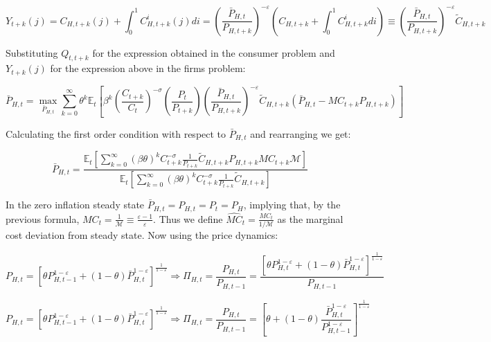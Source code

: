 \documentclass{article}
\newcommand{\Et}{\mathbb{E}_t}
\begin{document}
\begin{equation}
    Y_{t+k}(j) = C_{H,t+k}(j) + \int_0^1 C^i_{H, t+k}(j) di = \left( \frac{\bar P_{H,t}}{P_{H,t+k}} \right)^{-\varepsilon} \left(C_{H,t+k} +  \int_0^1 C^i_{H, t+k} di \right) \equiv \left( \frac{\bar P_{H,t}}{P_{H,t+k}} \right)^{-\varepsilon} \tilde C_{H,t+k}
\end{equation}

Substituting $Q_{t, t+k}$ for the expression obtained in the consumer problem and $Y_{t+k}(j)$ for the expression above in the firms problem:

\begin{equation}
    \bar P_{H,t} = \max_{\bar P_{H,t}} \sum^\infty_{k=0} \theta^k \Et \left[ \beta^k \left( \frac{C_{t+k}}{C_t} \right)^{-\sigma} \left( \frac{P_{t}}{P_{t+k}} \right) \left( \frac{\bar P_{H,t}}{P_{H,t+k}} \right)^{-\varepsilon} \tilde C_{H,t+k} (\bar P_{H,t} - MC_{t+k} P_{H,t+k})  \right]
\end{equation}

Calculating the first order condition with respect to $\bar P_{H,t}$ and rearranging we get:

\begin{equation}
    \bar P_{H,t} =  \frac{\Et\left[ \sum^\infty_{k=0} (\beta\theta)^k C_{t+k}^{-\sigma} \frac{1}{P_{t+k}}\tilde C_{H,t+k} P_{H,t+k} MC_{t+k} \mathcal M \right] }{\Et\left[ \sum^\infty_{k=0} (\beta\theta)^k C_{t+k}^{-\sigma} \frac{1}{P_{t+k}} \tilde C_{H,t+k}  \right]}
\end{equation}

In the zero inflation steady state $\bar P_{H,t} = P_{H,t} = P_{t} = P_H$, implying that, by the previous formula, $MC_{t}  = \frac{1}{\mathcal M} \equiv \frac{\varepsilon-1}{\varepsilon}$. Thus we define $\widehat{MC}_t = \frac{MC_t}{1/ \mathcal M}$ as the marginal cost deviation from steady state. Now using the price dynamics:

\begin{equation}
    P_{H,t} = [ \theta P_{H,t-1}^{1-\varepsilon} + (1-\theta) \bar P_{H,t}^{1-\varepsilon}]^\frac{1}{1-\varepsilon} \Rightarrow \Pi_{H,t} = \frac{P_{H,t}}{P_{H,t-1}} =  \frac{\left[ \theta P_{H,t}^{1-\varepsilon} + (1-\theta) \bar P_{H,t}^{1-\varepsilon}\right]^\frac{1}{1-\varepsilon}}{P_{H,t-1}} 
\end{equation}

\begin{equation}
    P_{H,t} = [ \theta P_{H,t-1}^{1-\varepsilon} + (1-\theta) \bar P_{H,t}^{1-\varepsilon}]^\frac{1}{1-\varepsilon} \Rightarrow \Pi_{H,t} = \frac{P_{H,t}}{P_{H,t-1}} =  \left[ \theta + (1-\theta) \frac{\bar P_{H,t}^{1-\varepsilon}}{P_{H,t-1}^{1-\varepsilon}} \right]^\frac{1}{1-\varepsilon} 
\end{equation}
\end{document}
